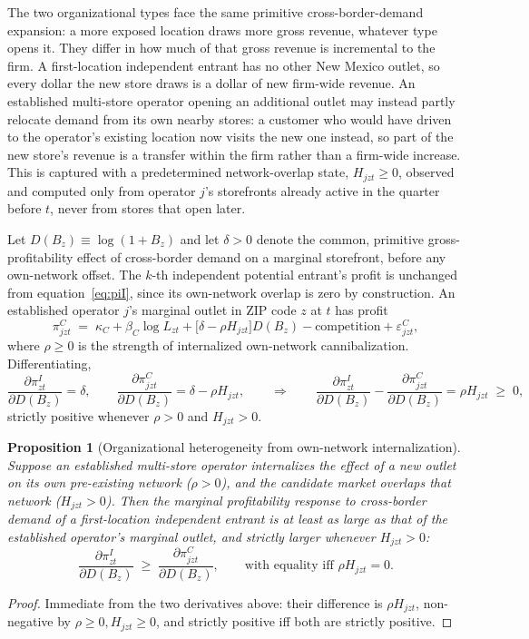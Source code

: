 \documentclass[english,12pt]{article}
\newtheorem{proposition}{Proposition}
\begin{document}
The two organizational types face the same primitive cross-border-demand expansion: a more exposed location draws more gross revenue, whatever type opens it. They differ in how much of that gross revenue is incremental to the firm. A first-location independent entrant has no other New Mexico outlet, so every dollar the new store draws is a dollar of new firm-wide revenue. An established multi-store operator opening an additional outlet may instead partly relocate demand from its own nearby stores: a customer who would have driven to the operator's existing location now visits the new one instead, so part of the new store's revenue is a transfer within the firm rather than a firm-wide increase. This is captured with a predetermined network-overlap state, $H_{jzt}\ge 0$, observed and computed only from operator $j$'s storefronts already active in the quarter before $t$, never from stores that open later.

Let $D(B_z)\equiv\log(1+B_z)$ and let $\delta>0$ denote the common, primitive gross-profitability effect of cross-border demand on a marginal storefront, before any own-network offset. The $k$-th independent potential entrant's profit is unchanged from equation~\eqref{eq:piI}, since its own-network overlap is zero by construction. An established operator $j$'s marginal outlet in ZIP code $z$ at $t$ has profit
\begin{equation}
\pi^C_{jzt} \;=\; \kappa_C + \beta_C\log L_{zt} + \big[\delta - \rho H_{jzt}\big]D(B_z) - \text{competition} + \varepsilon^C_{jzt}, \label{eq:piC_micro}
\end{equation}
where $\rho\ge 0$ is the strength of internalized own-network cannibalization. Differentiating,
\[
\frac{\partial \pi^I_{zt}}{\partial D(B_z)} = \delta, \qquad \frac{\partial \pi^C_{jzt}}{\partial D(B_z)} = \delta - \rho H_{jzt}, \qquad \Longrightarrow \qquad \frac{\partial \pi^I_{zt}}{\partial D(B_z)} - \frac{\partial \pi^C_{jzt}}{\partial D(B_z)} = \rho H_{jzt} \;\ge\; 0,
\]
strictly positive whenever $\rho>0$ and $H_{jzt}>0$.

\begin{proposition}[Organizational heterogeneity from own-network internalization]
\label{prop:cannibalization}
Suppose an established multi-store operator internalizes the effect of a new outlet on its own pre-existing network ($\rho>0$), and the candidate market overlaps that network ($H_{jzt}>0$). Then the marginal profitability response to cross-border demand of a first-location independent entrant is at least as large as that of the established operator's marginal outlet, and strictly larger whenever $H_{jzt}>0$:
\[
\frac{\partial \pi^I_{zt}}{\partial D(B_z)} \;\ge\; \frac{\partial \pi^C_{jzt}}{\partial D(B_z)}, \qquad \text{with equality iff } \rho H_{jzt}=0.
\]
\end{proposition}
\begin{proof}
Immediate from the two derivatives above: their difference is $\rho H_{jzt}$, non-negative by $\rho\ge0, H_{jzt}\ge0$, and strictly positive iff both are strictly positive.
\end{proof}
\end{document}
